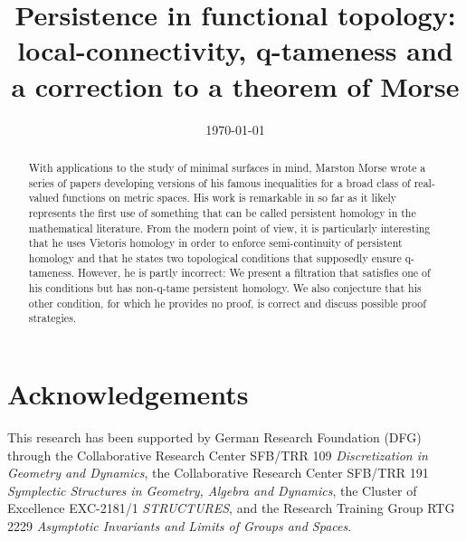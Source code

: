 \documentclass{amsart}
\theoremstyle{plain}
\theoremstyle{definition}
\begin{document}
\title[Persistence in functional topology]{Persistence in functional topology: local-connectivity, q-tameness and a correction to a theorem of Morse}
\author{}
\date{\today}

\begin{abstract}
With applications to the study of minimal surfaces in mind, Marston Morse wrote a series of papers developing versions of his famous inequalities for a broad class of real-valued functions on metric spaces. His work is remarkable in so far as it likely represents the first use of something that can be called persistent homology in the mathematical literature. From the modern point of view, it is particularly interesting that he uses Vietoris homology in order to enforce semi-continuity of persistent homology and that he states two topological conditions that supposedly ensure q-tameness. However, he is partly incorrect: We present a filtration that satisfies one of his conditions but has non-q-tame persistent homology. We also conjecture that his other condition, for which he provides no proof, is correct and discuss possible proof strategies.
\end{abstract}

\maketitle







%

\section*{Acknowledgements}
This research has been supported by German Research Foundation (DFG) through the Collaborative Research Center SFB/TRR 109 \emph{Discretization in Geometry and Dynamics}, the Collaborative Research Center SFB/TRR 191 \emph{Symplectic Structures in Geometry, Algebra and Dynamics}, the Cluster of Excellence EXC-2181/1 \emph{STRUCTURES}, and the Research Training Group RTG 2229 \emph{Asymptotic Invariants and Limits of Groups and Spaces}.




\todos
\end{document}
